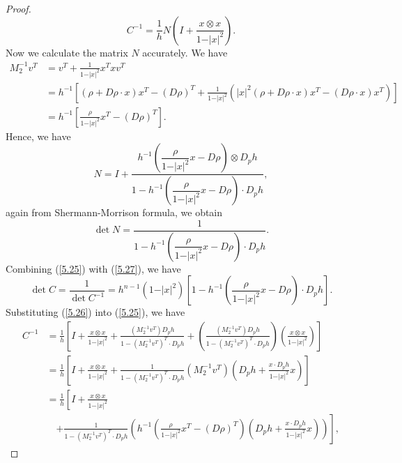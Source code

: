 \documentclass[10pt,a4paper]{amsart}
\begin{document}
\begin{proof}
\begin{equation}
    C^{-1} = \frac{1}{h}N\left(I + \frac{x \otimes x}{1 - \vert x \vert^{2}}\right).
  \end{equation}
  Now we calculate the matrix $N$ accurately. We have
  \begin{align*}
    M_{2}^{-1}v^{T} & = v^{T} + \frac{1}{1 - \vert x \vert^{2}} x^{T}xv^{T} \\
      & = h^{-1}\left[(\rho + D\rho \cdot x)x^{T} - (D\rho)^{T} + \frac{1}{1 - \vert x \vert^{2}}(\vert x \vert^{2}(\rho + D\rho \cdot x)x^{T} - (D\rho \cdot x)x^{T})\right] \\
      & = h^{-1}\left[\frac{\rho}{1 - \vert x \vert^{2}}x^{T} - (D\rho)^{T}\right].
  \end{align*}
  Hence, we have
  \begin{equation}\label{5.26}
    N = I + \frac{h^{-1}\left(\dfrac{\rho}{1 - \vert x \vert^{2}}x - D\rho\right)\otimes D_{p}h}{1 - h^{-1}\left(\dfrac{\rho}{1 - \vert x \vert^{2}}x - D\rho\right)\cdot D_{p}h},
  \end{equation}
  again from Shermann-Morrison formula, we obtain
    \begin{equation}\label{5.27}
    \det N = \frac{1}{1 - h^{-1}\left(\dfrac{\rho}{1 - \vert x \vert^{2}}x - D\rho\right)\cdot D_{p}h}.
  \end{equation}
  Combining (\ref{5.25}) with (\ref{5.27}), we have
    \begin{equation}\label{5.28}
    \det C = \frac{1}{\det C^{-1}} = h^{n-1}(1 - \vert x \vert^{2})\left[1 - h^{-1}\left(\frac{\rho}{1 - \vert x \vert^{2}}x - D\rho\right)\cdot D_{p}h\right].
  \end{equation}
  Substituting (\ref{5.26}) into (\ref{5.25}), we have
    \begin{align*}
    C^{-1} & = \frac{1}{h}\left[I + \frac{x\otimes x}{1 - \vert x \vert^{2}} + \frac{(M_{2}^{-1}v^{T})D_{p}h}{1 - (M_{2}^{-1}v^{T})^{T}\cdot D_{p}h} + \left(\frac{(M_{2}^{-1}v^{T})D_{p}h}{1 - (M_{2}^{-1}v^{T})^{T}\cdot D_{p}h}\right)\left(\frac{x \otimes x}{1 - \vert x \vert^{2}}\right)\right] \\
      & = \frac{1}{h}\left[I + \frac{x\otimes x}{1 - \vert x \vert^{2}} + \frac{1}{1 - (M_{2}^{-1}v^{T})^{T}\cdot D_{p}h}(M_{2}^{-1}v^{T})\left(D_{p}h + \frac{x \cdot D_{p}h}{1 - \vert x \vert^{2}}x\right)\right] \\
      & = \frac{1}{h}\left[I + \frac{x\otimes x}{1 - \vert x \vert^{2}}\right.  \\
      & \quad \left. + \frac{1}{1 - (M_{2}^{-1}v^{T})^{T}\cdot D_{p}h}\left(h^{-1}\left(\frac{\rho}{1 - \vert x \vert^{2}}x^{T} - (D\rho)^{T}\right)\left(D_{p}h + \frac{x \cdot D_{p}h}{1 - \vert x \vert^{2}}x\right)\right)\right],

\end{align*}
\end{proof}
\end{document}

